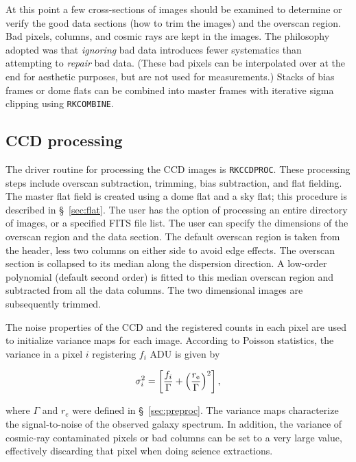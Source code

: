 \documentclass[12pt,preprint]{aastex}
\begin{document}
At this point a few cross-sections of images should be examined to
determine or verify the good data sections (how to trim the images)
and the overscan region.  Bad pixels, columns, and cosmic rays are
kept in the images.  The philosophy adopted was that \emph{ignoring}
bad data introduces fewer systematics than attempting to \emph{repair}
bad data.  (These bad pixels can be interpolated over at the end for
aesthetic purposes, but are not used for measurements.)  Stacks of
bias frames or dome flats can be combined into master frames with
iterative sigma clipping using {\tt RKCOMBINE}.

\subsection{CCD processing}\label{sec:proc}

The driver routine for processing the CCD images is {\tt RKCCDPROC}.
These processing steps include overscan subtraction, trimming, bias
subtraction, and flat fielding.  The master flat field is created
using a dome flat and a sky flat; this procedure is described in
\S~\ref{sec:flat}.  The user has the option of processing an entire
directory of images, or a specified FITS file list.  The user can
specify the dimensions of the overscan region and the data section.
The default overscan region is taken from the header, less two columns
on either side to avoid edge effects.  The overscan section is
collapsed to its median along the dispersion direction.  A low-order
polynomial (default second order) is fitted to this median overscan
region and subtracted from all the data columns.  The two dimensional
images are subsequently trimmed.

The noise properties of the CCD and the registered counts in each
pixel are used to initialize variance maps for each image.  According
to Poisson statistics, the variance in a pixel $i$ registering $f_{i}$
ADU is given by

\begin{equation}
\sigma_{i}^{2} = \left[ \frac{f_{i}}{\Gamma} + \left(\frac{r_{\rm
e}}{\Gamma}\right)^{2} \right],
\end{equation}

\noindent where $\Gamma$ and $r_{e}$ were defined in
\S~\ref{sec:preproc}.  The variance maps characterize the
signal-to-noise of the observed galaxy spectrum.  In addition, the
variance of cosmic-ray contaminated pixels or bad columns can be set
to a very large value, effectively discarding that pixel when doing
science extractions.
\end{document}

